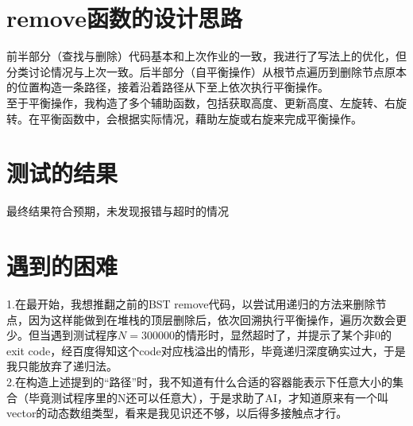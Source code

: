 \documentclass[UTF8]{ctexart}
\begin{document}
\pagestyle{fancy}
\fancyhead{}

\section{remove函数的设计思路}
前半部分（查找与删除）代码基本和上次作业的一致，我进行了写法上的优化，但分类讨论情况与上次一致。后半部分（自平衡操作）从根节点遍历到删除节点原本的位置构造一条路径，接着沿着路径从下至上依次执行平衡操作。\\
至于平衡操作，我构造了多个辅助函数，包括获取高度、更新高度、左旋转、右旋转。在平衡函数中，会根据实际情况，藉助左旋或右旋来完成平衡操作。

\section{测试的结果}
最终结果符合预期，未发现报错与超时的情况

\section{遇到的困难}
1.在最开始，我想推翻之前的BST remove代码，以尝试用递归的方法来删除节点，因为这样能做到在堆栈的顶层删除后，依次回溯执行平衡操作，遍历次数会更少。但当遇到测试程序$N=300000$的情形时，显然超时了，并提示了某个非0的exit code，经百度得知这个code对应栈溢出的情形，毕竟递归深度确实过大，于是我只能放弃了递归法。\\
2.在构造上述提到的“路径”时，我不知道有什么合适的容器能表示下任意大小的集合（毕竟测试程序里的N还可以任意大），于是求助了AI，才知道原来有一个叫vector的动态数组类型，看来是我见识还不够，以后得多接触点才行。
\end{document}
